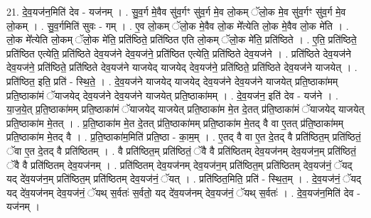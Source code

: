 \documentclass[17pt]{extarticle}
\begin{document}
21. दे॒व॒यज॑न॒मिति॑ देव - यज॑नम् । . सु॒व॒र्ग मे॒वैव सु॑व॒र्गꣳ सु॑व॒र्ग मे॒व लो॒कम् ॅलो॒क मे॒व सु॑व॒र्गꣳ सु॑व॒र्ग मे॒व लो॒कम् । . सु॒व॒र्गमिति॑ सुवः - गम् । . ए॒व लो॒कम् ॅलो॒क मे॒वैव लो॒क मे᳚त्येति लो॒क मे॒वैव लो॒क मे॑ति । . लो॒क मे᳚त्येति लो॒कम् ॅलो॒क मे॑ति॒ प्रति॑ष्ठिते॒ प्रति॑ष्ठित एति लो॒कम् ॅलो॒क मे॑ति॒ प्रति॑ष्ठिते । . ए॒ति॒ प्रति॑ष्ठिते॒ प्रति॑ष्ठित एत्येति॒ प्रति॑ष्ठिते देव॒यज॑ने देव॒यज॑ने॒ प्रति॑ष्ठित एत्येति॒ प्रति॑ष्ठिते देव॒यज॑ने । . प्रति॑ष्ठिते देव॒यज॑ने देव॒यज॑ने॒ प्रति॑ष्ठिते॒ प्रति॑ष्ठिते देव॒यज॑ने याजयेद् याजयेद् देव॒यज॑ने॒ प्रति॑ष्ठिते॒ प्रति॑ष्ठिते देव॒यज॑ने याजयेत् । . प्रति॑ष्ठित॒ इति॒ प्रति॑ - स्थि॒ते॒ । . दे॒व॒यज॑ने याजयेद् याजयेद् देव॒यज॑ने देव॒यज॑ने याजयेत् प्रति॒ष्ठाका॑मम् प्रति॒ष्ठाका॑मं ॅयाजयेद् देव॒यज॑ने देव॒यज॑ने याजयेत् प्रति॒ष्ठाका॑मम् । . दे॒व॒यज॑न॒ इति॑ देव - यज॑ने । . या॒ज॒ये॒त् प्र॒ति॒ष्ठाका॑मम् प्रति॒ष्ठाका॑मं ॅयाजयेद् याजयेत् प्रति॒ष्ठाका॑म मे॒त दे॒तत् प्र॑ति॒ष्ठाका॑मं ॅयाजयेद् याजयेत् प्रति॒ष्ठाका॑म मे॒तत् । . प्र॒ति॒ष्ठाका॑म मे॒त दे॒तत् प्र॑ति॒ष्ठाका॑मम् प्रति॒ष्ठाका॑म मे॒तद् वै वा ए॒तत् प्र॑ति॒ष्ठाका॑मम् प्रति॒ष्ठाका॑म मे॒तद् वै । . प्र॒ति॒ष्ठाका॑म॒मिति॑ प्रति॒ष्ठा - का॒म॒म् । . ए॒तद् वै वा ए॒त दे॒तद् वै प्रति॑ष्ठित॒म् प्रति॑ष्ठितं॒ ॅवा ए॒त दे॒तद् वै प्रति॑ष्ठितम् । . वै प्रति॑ष्ठित॒म् प्रति॑ष्ठितं॒ ॅवै वै प्रति॑ष्ठितम् देव॒यज॑नम् देव॒यज॑न॒म् प्रति॑ष्ठितं॒ ॅवै वै प्रति॑ष्ठितम् देव॒यज॑नम् । . प्रति॑ष्ठितम् देव॒यज॑नम् देव॒यज॑न॒म् प्रति॑ष्ठित॒म् प्रति॑ष्ठितम् देव॒यज॑नं॒ ॅयद् यद् दे॑व॒यज॑न॒म् प्रति॑ष्ठित॒म् प्रति॑ष्ठितम् देव॒यज॑नं॒ ॅयत् । . प्रति॑ष्ठित॒मिति॒ प्रति॑ - स्थि॒त॒म् । . दे॒व॒यज॑नं॒ ॅयद् यद् दे॑व॒यज॑नम् देव॒यज॑नं॒ ॅयथ् स॒र्वतः॑ स॒र्वतो॒ यद् दे॑व॒यज॑नम् देव॒यज॑नं॒ ॅयथ् स॒र्वतः॑ । . दे॒व॒यज॑न॒मिति॑ देव - यज॑नम् । \newline
\end{document}
